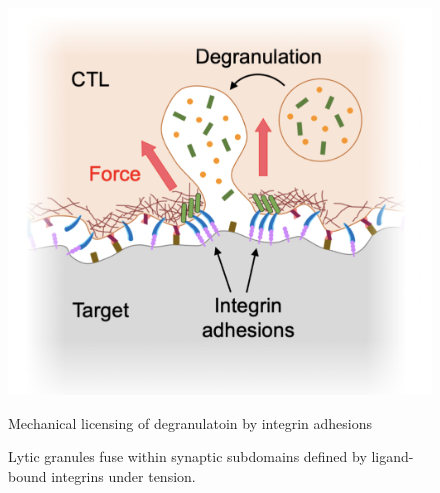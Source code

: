 \begin{figure}[htbp]
	\centering
	\includegraphics[width=\textwidth]{../figures/chapter3/integrinmodel.png}
	\caption{Mechanical licensing of degranulatoin by integrin adhesions}
	\caption*{Lytic granules fuse within synaptic subdomains defined by ligand-bound integrins under tension.}
	\label{fig:integrinmodel}
\end{figure}

